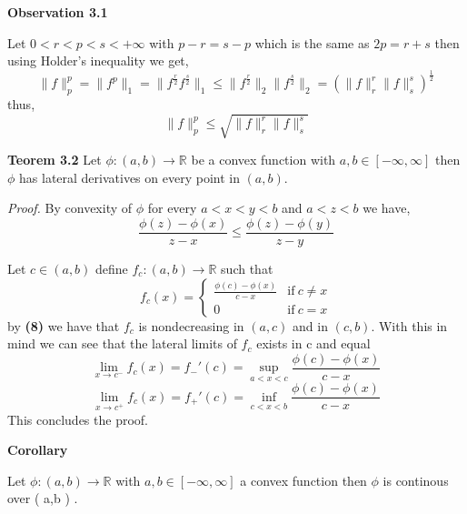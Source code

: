 \documentclass{article}
\begin{document}
\bigbreak

\begin{observation}\textbf{Observation 3.1}

Let $0 < r < p < s < +\infty$ with $p-r=s-p$ which is the same as $2p=r+s$ then using Holder's inequality we get,  
\[
    \|f\|_p^p = \|f^p\|_1 = \|f^{\frac{r}{2}}f^{\frac{s}{2}}\|_1 \le \|f^{\frac{r}{2}}\|_2 \|f^{\frac{s}{2}}\|_2 = \left( \|f\|_r^r \|f\|_s^s   \right)^{\frac{1}{2}}    
\]
thus,
\[
    \|f\|_p^p \le \sqrt{\|f\|_r^r \|f\|_s^s  }   
\]
\end{observation}

\begin{theorem}\textbf{Teorem 3.2}
    Let $\phi : \left( a,b \right) \rightarrow \mathbb{R}$ be a convex function with $a,b \in [-\infty,\infty]$ then $\phi$ has lateral derivatives on every point in $ \left( a,b \right) $.

    \textit{Proof.} By convexity of $\phi$ for every $a < x < y < b$ and $a< z <b$  we have,
    \begin{equation}
        \frac{\phi \left( z \right) - \phi \left( x \right) }{z - x} \le \frac{\phi \left( z \right) - \phi \left( y \right) }{z - y}
    \end{equation}

    Let $c \in \left( a,b \right) $ define $f_c: \left( a,b \right) \rightarrow \mathbb{R}$ such that
    \[
    f_c \left( x \right) = 
       \begin{cases}
           \frac{\phi(c)-\phi(x)}{c-x} & \text{if}\  c \neq x \\
           0 & \text{if}\ c = x
       \end{cases}
    \]
    by \textbf{(8)} we have that $f_c$ is nondecreasing in $ \left( a,c \right) $ and in $ \left( c,b \right) $. With this in mind we can see that the lateral limits of $f_c$ exists in c and equal
    \[
        \lim_{x \to c^-}f_c \left( x \right) = f_{-}' \left( c \right) = \sup_{a < x < c}\frac{\phi(c)-\phi(x)}{c-x} 
    \]
    \[
        \lim_{x \to c^+}f_c \left( x \right) = f_{+}' \left( c \right)  = \inf_{c < x < b}\frac{\phi(c)-\phi(x)}{c-x}
    \]
    This concludes the proof.
\end{theorem}

\bigbreak

\begin{corollary}\textbf{Corollary}

    Let $\phi: \left( a,b \right) \rightarrow \mathbb{R}$ with $a,b \in [-\infty, \infty]$ a convex function then $\phi$ is continous over \left( a,b \right) .
    
\end{corollary}
\end{document}
